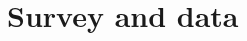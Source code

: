 \documentclass[12pt]{article} %
\providecommand{\DIFaddbegin}{} %
\providecommand{\DIFaddend}{} %
\newcommand{\DIFaddincludegraphics}[2][]{{\color{blue}\fbox{\DIFOincludegraphics[#1]{#2}}}} %
\DeclareRobustCommand{\DIFaddbegin}{\DIFOaddbegin \let\includegraphics\DIFaddincludegraphics} %
\DeclareRobustCommand{\DIFaddend}{\DIFOaddend \let\includegraphics\DIFOincludegraphics} %
\begin{document}


\DIFaddbegin 

\DIFaddend \section{Survey and data} \label{sec:survey}
\end{document}
